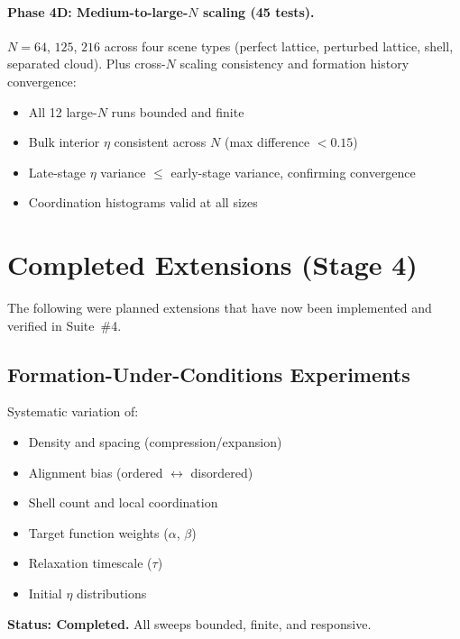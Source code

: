 \documentclass[11pt]{article}
\begin{document}
\paragraph{Phase 4D: Medium-to-large-$N$ scaling (45 tests).}
$N = 64$, $125$, $216$ across four scene types (perfect lattice, perturbed
lattice, shell, separated cloud).  Plus cross-$N$ scaling consistency and
formation history convergence:
\begin{itemize}
    \item All 12 large-$N$ runs bounded and finite
    \item Bulk interior $\eta$ consistent across $N$ (max difference $<
          0.15$)
    \item Late-stage $\eta$ variance $\le$ early-stage variance,
          confirming convergence
    \item Coordination histograms valid at all sizes
\end{itemize}

\section{Completed Extensions (Stage 4)}
\label{sec:extensions}

The following were planned extensions that have now been implemented and
verified in Suite~\#4.

\subsection{Formation-Under-Conditions Experiments}

Systematic variation of:
\begin{itemize}
    \item Density and spacing (compression/expansion)
    \item Alignment bias (ordered $\leftrightarrow$ disordered)
    \item Shell count and local coordination
    \item Target function weights ($\alpha$, $\beta$)
    \item Relaxation timescale ($\tau$)
    \item Initial $\eta$ distributions
\end{itemize}

\textbf{Status: Completed.} All sweeps bounded, finite, and responsive.
\end{document}
